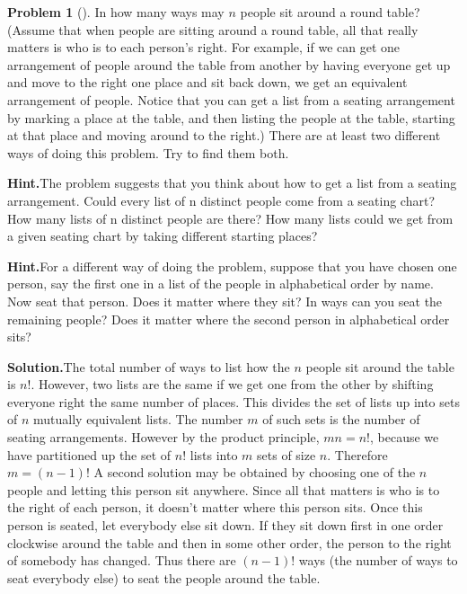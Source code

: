 \documentclass[10pt,]{book}
\theoremstyle{plain}
\theoremstyle{definition}
\newtheorem{activity}[project]{Problem}
\theoremstyle{definition}
\numberwithin{equation}{chapter}
\begin{document}
\begin{activity}[]\label{roundtable}
In how many ways may \(n\) people sit around a round table? (Assume that when people are sitting around a round table, all that really matters is who is to each person's right. For example, if we can get one arrangement of people around the table from another by having everyone get up and move to the right one place and sit back down, we get an equivalent arrangement of people. Notice that you can get a list from a seating arrangement by marking a place at the table, and then listing the people at the table, starting at that place and moving around to the right.) There are at least two different ways of doing this problem. Try to find them both.%
\par\medskip\noindent%
\textbf{Hint.}\quad The problem suggests that you think about how to get a list from a seating arrangement. Could every list of n distinct people come from a seating chart? How many lists of n distinct people are there? How many lists could we get from a given seating chart by taking different starting places?%
\par\medskip\noindent%
\textbf{Hint.}\quad For a different way of doing the problem, suppose that you have chosen one person, say the first one in a list of the people in alphabetical order by name. Now seat that person. Does it matter where they sit? In ways can you seat the remaining people? Does it matter where the second person in alphabetical order sits?%
\par\medskip\noindent%
\textbf{Solution.}\quad The total number of ways to list how the \(n\) people sit around the table is \(n!\). However, two lists are the same if we get one from the other by shifting everyone right the same number of places. This divides the set of lists up into sets of \(n\) mutually equivalent lists. The number \(m\) of such sets is the number of seating arrangements. However by the product principle, \(mn=n!\), because we have partitioned up the set of \(n!\) lists into \(m\) sets of size \(n\). Therefore \(m=(n-1)!\) A second solution may be obtained by choosing one of the \(n\) people and letting this person sit anywhere. Since all that matters is who is to the right of each person, it doesn't matter where this person sits. Once this person is seated, let everybody else sit down. If they sit down first in one order clockwise around the table and then in some other order, the person to the right of somebody has changed. Thus there are \((n-1)!\) ways (the number of ways to seat everybody else) to seat the people around the table.%
\end{activity}
\end{document}
